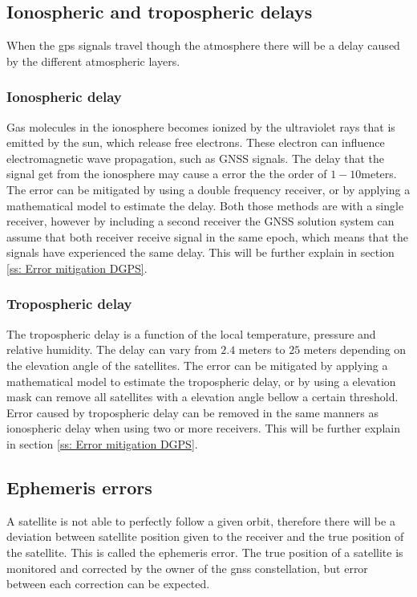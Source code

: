 \subsection{Ionospheric and tropospheric delays}\label{Ss:Atmosphere}
When the \gls{gps} signals travel though the atmosphere there will be a delay caused by the different atmospheric layers.
\subsubsection{Ionospheric delay}
Gas molecules in the ionosphere becomes ionized by the ultraviolet rays that is emitted by the sun, which release free electrons. These electron can influence electromagnetic wave propagation, such as GNSS signals. The delay that the signal get from the ionosphere may cause a error the the order of $1-10 $meters. The error can be mitigated by using a double frequency receiver, or by applying a mathematical model to estimate the delay. Both those methods are with a single receiver, however by including a second receiver the GNSS solution system can assume that both receiver receive signal in the same epoch, which means that the signals have experienced the same delay. This will be further explain in section \ref{ss: Error mitigation DGPS}.

\subsubsection{Tropospheric delay}
The tropospheric delay is a function of the local temperature, pressure and relative humidity. The delay can vary from $2.4$ meters to $25$ meters depending on the elevation angle of the satellites. The error can be mitigated by applying a mathematical model to estimate the tropospheric delay, or by using a elevation mask can remove all satellites with a elevation angle bellow a certain threshold. Error caused by tropospheric delay can be removed in the same manners as ionospheric delay when using two or more receivers. This will be further explain in section \ref{ss: Error mitigation DGPS}.

\subsection{Ephemeris errors}
A satellite is not able to perfectly follow a given orbit, therefore there will be a deviation between satellite position given to the receiver and the true position of the satellite. This is called the ephemeris error. The true position of a satellite is monitored and corrected by the owner of the \gls{gnss} constellation, but error between each correction can be expected.
